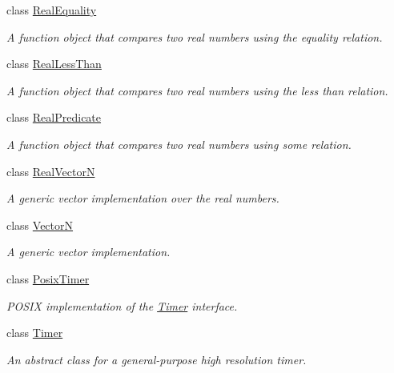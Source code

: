 \begin{DoxyCompactItemize}
class \hyperlink{classmetrobotics_1_1RealEquality}{\-Real\-Equality}
\begin{DoxyCompactList}\small\item\em \-A function object that compares two real numbers using the equality relation. \end{DoxyCompactList}\item 
class \hyperlink{classmetrobotics_1_1RealLessThan}{\-Real\-Less\-Than}
\begin{DoxyCompactList}\small\item\em \-A function object that compares two real numbers using the less than relation. \end{DoxyCompactList}\item 
class \hyperlink{classmetrobotics_1_1RealPredicate}{\-Real\-Predicate}
\begin{DoxyCompactList}\small\item\em \-A function object that compares two real numbers using some relation. \end{DoxyCompactList}\item 
class \hyperlink{classmetrobotics_1_1RealVectorN}{\-Real\-Vector\-N}
\begin{DoxyCompactList}\small\item\em \-A generic vector implementation over the real numbers. \end{DoxyCompactList}\item 
class \hyperlink{classmetrobotics_1_1VectorN}{\-Vector\-N}
\begin{DoxyCompactList}\small\item\em \-A generic vector implementation. \end{DoxyCompactList}\item 
class \hyperlink{classmetrobotics_1_1PosixTimer}{\-Posix\-Timer}
\begin{DoxyCompactList}\small\item\em \-P\-O\-S\-I\-X implementation of the \hyperlink{classmetrobotics_1_1Timer}{\-Timer} interface. \end{DoxyCompactList}\item 
class \hyperlink{classmetrobotics_1_1Timer}{\-Timer}
\begin{DoxyCompactList}\small\item\em \-An abstract class for a general-\/purpose high resolution timer. \end{DoxyCompactList}\end{DoxyCompactItemize}
